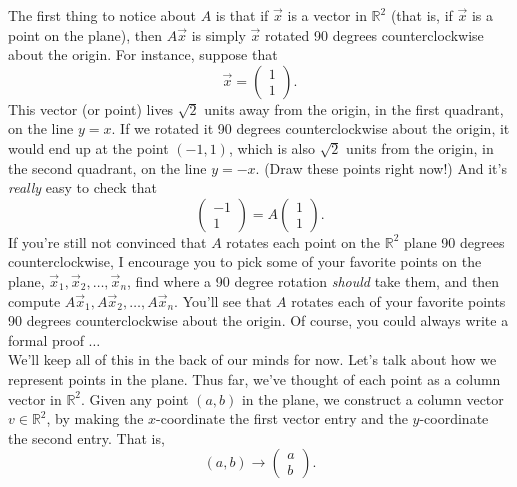 \documentclass{article}
\begin{document}
The first thing to notice about $A$ is that if $\vec{x}$ is a vector in $\mathbb{R}^2$ (that is, if $\vec{x}$ is a point on the plane), then $A\vec{x}$ is simply $\vec{x}$ rotated 90 degrees counterclockwise about the origin. For instance, suppose that $$\vec{x} = \begin{pmatrix}1\\1\end{pmatrix}.$$ This vector (or point) lives $\sqrt{2}$ units away from the origin, in the first quadrant, on the line $y = x$. If we rotated it 90 degrees counterclockwise about the origin, it would end up at the point $\left(-1, 1\right)$, which is also $\sqrt{2}$ units from the origin, in the second quadrant, on the line $y = -x$. (Draw these points right now!) And it's \textit{really} easy to check that $$\begin{pmatrix}-1\\1\end{pmatrix} = A\begin{pmatrix}1\\1\end{pmatrix}.$$ If you're still not convinced that $A$ rotates each point on the $\mathbb{R}^2$ plane 90 degrees counterclockwise, I encourage you to pick some of your favorite points on the plane, $\vec{x}_1, \vec{x}_2, \dots, \vec{x}_n$, find where a 90 degree rotation \textit{should} take them, and then compute $A\vec{x}_1, A\vec{x}_2, \dots, A\vec{x}_n$. You'll see that $A$ rotates each of your favorite points 90 degrees counterclockwise about the origin. Of course, you could always write a formal proof $\dots$\\

We'll keep all of this in the back of our minds for now. Let's talk about how we represent points in the plane. Thus far, we've thought of each point as a column vector in $\mathbb{R}^2$. Given any point $\left(a, b\right)$ in the plane, we construct a column vector $v \in \mathbb{R}^2$, by making the $x$-coordinate the first vector entry and the $y$-coordinate the second entry. That is, $$\left(a, b\right) \rightarrow \begin{pmatrix}a\\b\end{pmatrix}.$$
\end{document}
